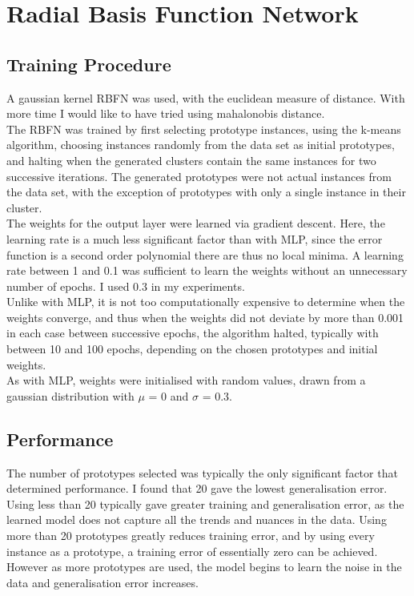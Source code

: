 \documentclass{article}
\begin{document}
\section*{Radial Basis Function Network}
\subsection*{Training Procedure}
\noindent A gaussian kernel RBFN was used, with the euclidean measure of distance. With more time I would like to have tried using mahalonobis distance. \\
\indent The RBFN was trained by first selecting prototype instances, using the k-means algorithm, choosing instances randomly from the data set as initial prototypes, and halting when the generated clusters contain the same instances for two successive iterations. The generated prototypes were not actual instances from the data set, with the exception of prototypes with only a single instance in their cluster. \\
\indent The weights for the output layer were learned via gradient descent. Here, the learning rate is a much less significant factor than with MLP, since the error function is a second order polynomial there are thus no local minima. A learning rate between 1 and 0.1 was sufficient to learn the weights without an unnecessary number of epochs. I used 0.3 in my experiments. \\
\indent Unlike with MLP, it is not too computationally expensive to determine when the weights converge, and thus when the weights did not deviate by more than 0.001 in each case between successive epochs, the algorithm halted, typically with between 10 and 100 epochs, depending on the chosen prototypes and initial weights. \\
\indent As with MLP, weights were initialised with random values, drawn from a gaussian distribution with $\mu$ = 0 and $\sigma$ = 0.3. \\
\subsection*{Performance}
The number of prototypes selected was typically the only significant factor that determined performance. I found that 20 gave the lowest generalisation error. Using less than 20 typically gave greater training and generalisation error, as the learned model does not capture all the trends and nuances in the data. Using more than 20 prototypes greatly reduces training error, and by using every instance as a prototype, a training error of essentially zero can be achieved. However as more prototypes are used, the model begins to learn the noise in the data and generalisation error increases.
\end{document}
